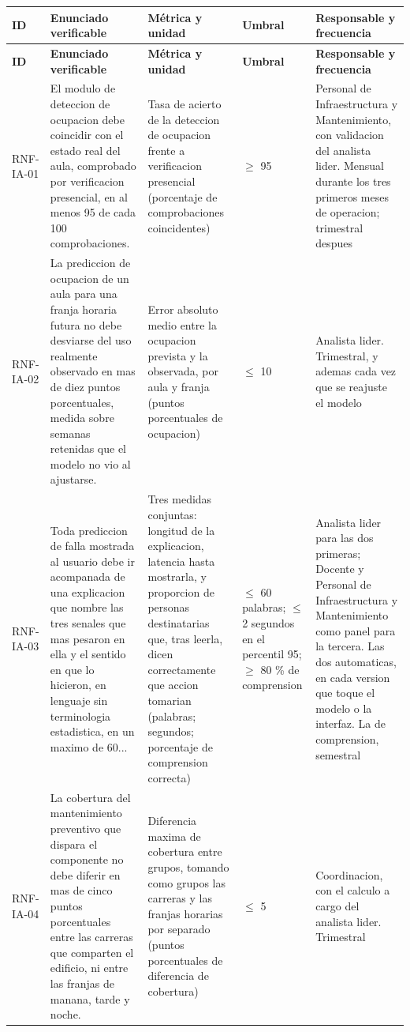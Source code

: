 \begingroup
\footnotesize
\begin{longtable}{|p{1.6cm}|p{4.4cm}|p{2.5cm}|p{2.2cm}|p{2.6cm}|}
\hline
\textbf{ID} & \textbf{Enunciado verificable} & \textbf{Métrica y unidad} & \textbf{Umbral} & \textbf{Responsable y frecuencia} \\ \hline
\endfirsthead
\hline
\textbf{ID} & \textbf{Enunciado verificable} & \textbf{Métrica y unidad} & \textbf{Umbral} & \textbf{Responsable y frecuencia} \\ \hline
\endhead
RNF-IA-01 & El modulo de deteccion de ocupacion debe coincidir con el estado real del aula, comprobado por verificacion presencial, en al menos 95 de cada 100 comprobaciones. & Tasa de acierto de la deteccion de ocupacion frente a verificacion presencial (porcentaje de comprobaciones coincidentes) & $\geq$ 95 & Personal de Infraestructura y Mantenimiento, con validacion del analista lider. Mensual durante los tres primeros meses de operacion; trimestral despues \\ \hline
RNF-IA-02 & La prediccion de ocupacion de un aula para una franja horaria futura no debe desviarse del uso realmente observado en mas de diez puntos porcentuales, medida sobre semanas retenidas que el modelo no vio al ajustarse. & Error absoluto medio entre la ocupacion prevista y la observada, por aula y franja (puntos porcentuales de ocupacion) & $\leq$ 10 & Analista lider. Trimestral, y ademas cada vez que se reajuste el modelo \\ \hline
RNF-IA-03 & Toda prediccion de falla mostrada al usuario debe ir acompanada de una explicacion que nombre las tres senales que mas pesaron en ella y el sentido en que lo hicieron, en lenguaje sin terminologia estadistica, en un maximo de 60... & Tres medidas conjuntas: longitud de la explicacion, latencia hasta mostrarla, y proporcion de personas destinatarias que, tras leerla, dicen correctamente que accion tomarian (palabras; segundos; porcentaje de comprension correcta) & $\leq$ 60 palabras; $\leq$ 2 segundos en el percentil 95; $\geq$ 80 \% de comprension & Analista lider para las dos primeras; Docente y Personal de Infraestructura y Mantenimiento como panel para la tercera. Las dos automaticas, en cada version que toque el modelo o la interfaz. La de comprension, semestral \\ \hline
RNF-IA-04 & La cobertura del mantenimiento preventivo que dispara el componente no debe diferir en mas de cinco puntos porcentuales entre las carreras que comparten el edificio, ni entre las franjas de manana, tarde y noche. & Diferencia maxima de cobertura entre grupos, tomando como grupos las carreras y las franjas horarias por separado (puntos porcentuales de diferencia de cobertura) & $\leq$ 5 & Coordinacion, con el calculo a cargo del analista lider. Trimestral \\ \hline

\end{longtable}
